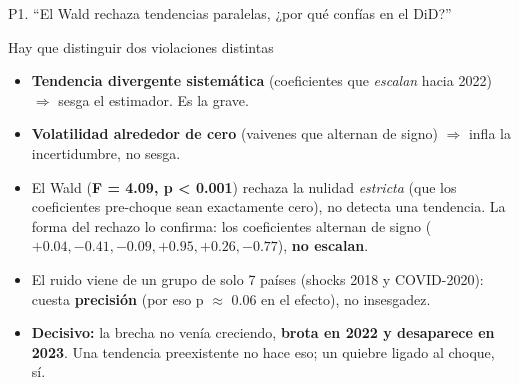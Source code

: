 \documentclass[aspectratio=169,10pt]{beamer}
\newcommand{\key}[1]{{\bfseries\color{AcentoRojo}#1}}
\begin{document}
\begin{frame}{P1. ``El Wald rechaza tendencias paralelas, ¿por qué confías en el DiD?''}
  \small
  \begin{block}{Hay que distinguir dos violaciones distintas}
    \begin{itemize}
      \item \textbf{Tendencia divergente sistemática} (coeficientes que \emph{escalan} hacia 2022)
            $\Rightarrow$ \alert{sesga} el estimador. Es la grave.
      \item \textbf{Volatilidad alrededor de cero} (vaivenes que alternan de signo) $\Rightarrow$
            infla la incertidumbre, \alert{no sesga}.
    \end{itemize}
  \end{block}
  \begin{itemize}
    \item El Wald (\key{F = 4.09, p < 0.001}) rechaza la nulidad \emph{estricta} (que los
          coeficientes pre-choque sean exactamente cero), no detecta una tendencia. La forma del
          rechazo lo confirma: los coeficientes alternan de signo ($+0.04,-0.41,-0.09,+0.95,+0.26,-0.77$),
          \textbf{no escalan}.
    \item El ruido viene de un grupo de solo 7 países (shocks 2018 y COVID-2020): cuesta
          \textbf{precisión} (por eso p $\approx$ 0.06 en el efecto), no insesgadez.
    \item \textbf{Decisivo:} la brecha no venía creciendo, \textbf{brota en 2022 y desaparece en
          2023}. Una tendencia preexistente no hace eso; un quiebre ligado al choque, sí.
  \end{itemize}

\end{frame}
\end{document}

